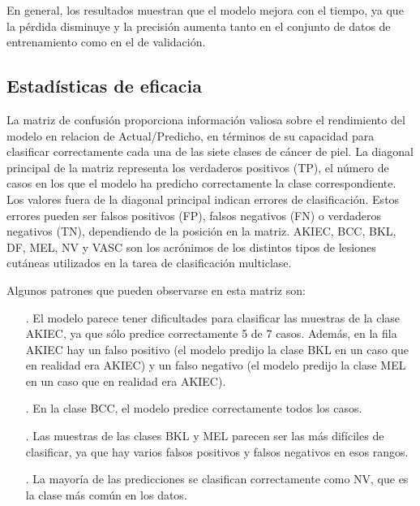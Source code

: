     En general, los resultados muestran que el modelo mejora con el tiempo, ya que la pérdida disminuye y la precisión aumenta tanto en el conjunto de datos de entrenamiento como en el de validación.

	\subsection{Estadísticas de eficacia}\label{sub:accuracy_statistic}
    La matriz de confusión proporciona información valiosa sobre el rendimiento del modelo en relacion de Actual/Predicho, en términos de su capacidad para clasificar correctamente cada una de las siete clases de cáncer de piel. 
    La diagonal principal de la matriz representa los verdaderos positivos (TP), el número de casos en los que el modelo ha predicho correctamente la clase correspondiente. Los valores fuera de la diagonal principal indican errores de clasificación. 
    Estos errores pueden ser falsos positivos (FP), falsos negativos (FN) o verdaderos negativos (TN), dependiendo de la posición en la matriz. 
    AKIEC, BCC, BKL, DF, MEL, NV y VASC son los acrónimos de los distintos tipos de lesiones cutáneas utilizados en la tarea de clasificación multiclase.

    Algunos patrones que pueden observarse en esta matriz son:

    \begin{enumerate}
       \item[.] El modelo parece tener dificultades para clasificar las muestras de la clase AKIEC, ya que sólo predice correctamente 5 de 7 casos. 
       Además, en la fila AKIEC hay un falso positivo (el modelo predijo la clase BKL en un caso que en realidad era AKIEC) y un falso negativo (el modelo predijo la clase MEL en un caso que en realidad era AKIEC). 
       \item[.] En la clase BCC, el modelo predice correctamente todos los casos.
       \item[.] Las muestras de las clases BKL y MEL parecen ser las más difíciles de clasificar, ya que hay varios falsos positivos y falsos negativos en esos rangos.
       \item[.] La mayoría de las predicciones se clasifican correctamente como NV, que es la clase más común en los datos.
    \end{enumerate}
    
